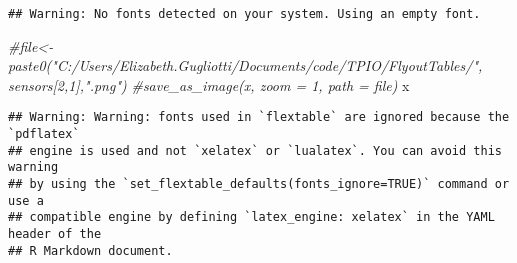 \documentclass[
]{article}
\newenvironment{Shaded}{\begin{snugshade}}{\end{snugshade}}
\newcommand{\CommentTok}[1]{\textcolor[rgb]{0.56,0.35,0.01}{\textit{#1}}}
\newcommand{\NormalTok}[1]{#1}
\begin{document}
\begin{verbatim}
## Warning: No fonts detected on your system. Using an empty font.
\end{verbatim}

\begin{Shaded}
\begin{Highlighting}[]
\CommentTok{\#file\textless{}{-}paste0("C:/Users/Elizabeth.Gugliotti/Documents/code/TPIO/FlyoutTables/", sensors[2,1],".png")}
\CommentTok{\#save\_as\_image(x, zoom = 1, path = file)}
\NormalTok{x}
\end{Highlighting}
\end{Shaded}

\begin{verbatim}
## Warning: Warning: fonts used in `flextable` are ignored because the `pdflatex`
## engine is used and not `xelatex` or `lualatex`. You can avoid this warning
## by using the `set_flextable_defaults(fonts_ignore=TRUE)` command or use a
## compatible engine by defining `latex_engine: xelatex` in the YAML header of the
## R Markdown document.
\end{verbatim}

\providecommand{\docline}[3]{\noalign{\global\setlength{\arrayrulewidth}{#1}}\arrayrulecolor[HTML]{#2}\cline{#3}}

\setlength{\tabcolsep}{2pt}

\renewcommand*{\arraystretch}{1.5}
\end{document}
